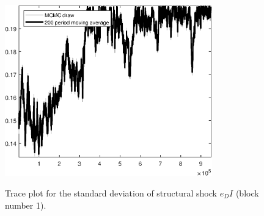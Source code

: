 \begin{figure}[H]
\centering
  \includegraphics[width=0.8\textwidth]{BRS_growth_util_sectoral/graphs/TracePlot_SE_e_DI_blck_1}\\
    \caption{Trace plot for the standard deviation of structural shock ${e_DI}$ (block number 1).}
\end{figure}

